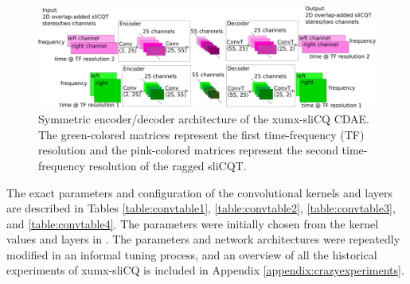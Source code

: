 \documentclass[report.tex]{subfiles}
\begin{document}
\begin{figure}[ht]
	\centering
	\includegraphics[width=\textwidth]{./images-blockdiagrams/xumx_slicq_cdae.png}
	\caption{Symmetric encoder/decoder architecture of the xumx-sliCQ CDAE. The green-colored matrices represent the first time-frequency (TF) resolution and the pink-colored matrices represent the second time-frequency resolution of the ragged sliCQT.}
	\label{fig:newcdaefig}
\end{figure}

The exact parameters and configuration of the convolutional kernels and layers are described in Tables \ref{table:convtable1}, \ref{table:convtable2}, \ref{table:convtable3}, and \ref{table:convtable4}. The parameters were initially chosen from the kernel values and layers in \textcite{plumbley1, plumbley2}. The parameters and network architectures were repeatedly modified in an informal tuning process, and an overview of all the historical experiments of xumx-sliCQ is included in Appendix \ref{appendix:crazyexperiments}.
\end{document}
